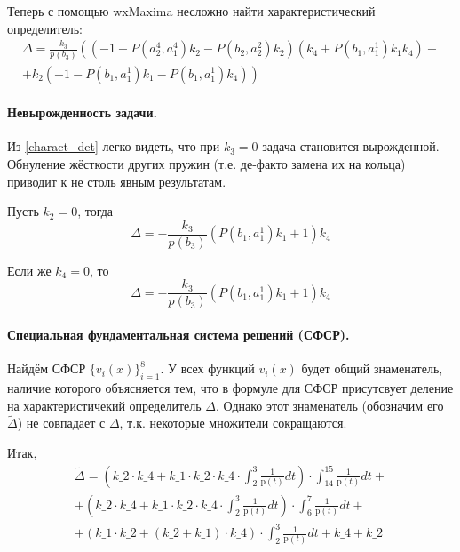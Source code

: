 \documentclass[a4paper,12pt]{article} %
\begin{document}
Теперь с помощью wxMaxima несложно найти характеристический определитель:
\begin{multline}\label{charact_det}
	\Delta =
	\frac{k_3}{p(b_3)}
	\left(
		\left( -1-P\left( a_2^4,a_1^4\right)  k_2-P\left( b_2,a_2^2\right)  k_2\right)
		\left( k_4+P\left( b_1,a_1^1\right)  k_1 k_4\right)
		\right. + \\ + \left.
		k_2 \left( -1-P\left( b_1,a_1^1\right)  k_1-P\left( b_1,a_1^1\right)  k_4\right)
	\right)
\end{multline}

\paragraph{Невырожденность задачи.}
Из \eqref{charact_det} легко видеть,
что при $k_3 = 0$ задача становится вырожденной.
Обнуление жёсткости других пружин (т.е. де-факто замена их на кольца)
приводит к не столь явным результатам.

Пусть $k_2 = 0$, тогда
\begin{equation}
	\Delta = - \frac{k_3}{p(b_3)} \left( P\left( b_1,a_1^1\right)  k_1+1\right)  k_4
\end{equation}

Если же $k_4 = 0$, то
\begin{equation}
	\Delta = - \frac{k_3}{p(b_3)} \left( P\left( b_1,a_1^1\right)  k_1+1\right)  k_4
\end{equation}


\paragraph{Специальная фундаментальная система решений (СФСР).}
Найдём СФСР $\{v_i(x)\}_{i=1}^{8}$.
У всех функций $v_i(x)$ будет общий знаменатель,
наличие которого объясняется тем,
что в формуле для СФСР присутсвует деление на характеристичекий определитель $\Delta$.
Однако этот знаменатель (обозначим его $\tilde{\Delta}$)
не совпадает с $\Delta$,
т.к. некоторые множители сокращаются.

Итак,
\begin{multline}
	\tilde{\Delta} =
	\left( \mathit{k\_2}\cdot \mathit{k\_4}+\mathit{k\_1}\cdot \mathit{k\_2}\cdot \mathit{k\_4}\cdot \int_{2}^{3}\frac{1}{\mathrm{p}\left( t\right) }dt\right) \cdot \int_{14}^{15}\frac{1}{\mathrm{p}\left( t\right) }dt+
	\\+
	\left( \mathit{k\_2}\cdot \mathit{k\_4}+\mathit{k\_1}\cdot \mathit{k\_2}\cdot \mathit{k\_4}\cdot \int_{2}^{3}\frac{1}{\mathrm{p}\left( t\right) }dt\right) \cdot \int_{6}^{7}\frac{1}{\mathrm{p}\left( t\right) }dt+
	\\+
	\left( \mathit{k\_1}\cdot \mathit{k\_2}+\left( \mathit{k\_2}+\mathit{k\_1}\right) \cdot \mathit{k\_4}\right) \cdot \int_{2}^{3}\frac{1}{\mathrm{p}\left( t\right) }dt+\mathit{k\_4}+\mathit{k\_2}
\end{multline}
\end{document}
